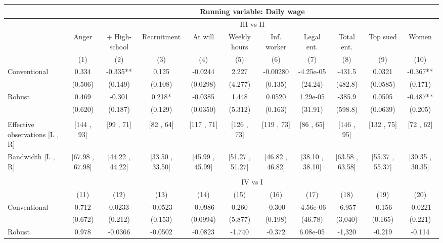 \begin{tabular}{lcccccccccc}
\toprule
      & \multicolumn{10}{c}{Running variable: Daily wage} \\
\midrule
      & \multicolumn{10}{c}{III vs II} \\
\midrule
\midrule
      & Anger & + High-school & Recruitment & At will  & Weekly hours & Inf. worker & Legal ent. & Total ent. & Top sued & Women \\
\midrule
      & (1)   & (2)   & (3)   & (4)   & (5)   & (6)   & (7)   & (8)   & (9)   & (10) \\
\midrule
\midrule
Conventional & 0.334 & -0.335** & 0.125 & -0.0244 & 2.227 & -0.00280 & -4.25e-05 & -431.5 & 0.0321 & -0.367** \\
      & (0.506) & (0.149) & (0.108) & (0.0298) & (4.277) & (0.135) & (24.24) & (482.8) & (0.0585) & (0.171) \\
Robust & 0.469 & -0.301 & 0.218* & -0.0385 & 1.448 & 0.0520 & 1.29e-05 & -385.9 & 0.0505 & -0.487** \\
      & (0.620) & (0.187) & (0.129) & (0.0350) & (5.312) & (0.163) & (31.91) & (598.8) & (0.0639) & (0.205) \\
      &       &       &       &       &       &       &       &       &       &  \\
\midrule
Effective observations [L , R] & [144 , 93] & [99 , 71] & [82 , 64] & [117 , 71] & [126 , 73] & [119 , 73] & [86 , 65] & [146 , 95] & [132 , 75] & [72 , 62] \\
Bandwidth [L , R] & [67.98 , 67.98] & [44.22 , 44.22] & [33.50 , 33.50] & [45.99 , 45.99] & [51.27 , 51.27] & [46.82 , 46.82] & [38.10 , 38.10] & [63.58 , 63.58] & [55.37 , 55.37] & [30.35 , 30.35] \\
\midrule
\midrule
      &       &       &       &       &       &       &       &       &       &  \\
\midrule
      & \multicolumn{10}{c}{IV vs I} \\
\midrule
\midrule
      & (11)  & (12)  & (13)  & (14)  & (15)  & (16)  & (17)  & (18)  & (19)  & (20) \\
\midrule
\midrule
Conventional & 0.712 & 0.0233 & -0.0523 & -0.0986 & 0.260 & -0.300 & -4.56e-06 & -6.957 & -0.156 & -0.0221 \\
      & (0.672) & (0.212) & (0.153) & (0.0994) & (5.877) & (0.198) & (46.78) & (3,040) & (0.165) & (0.221) \\
Robust & 0.978 & -0.0366 & -0.0502 & -0.0823 & -1.740 & -0.372 & 6.08e-05 & -1,320 & -0.219 & -0.114 \\

\end{tabular}
